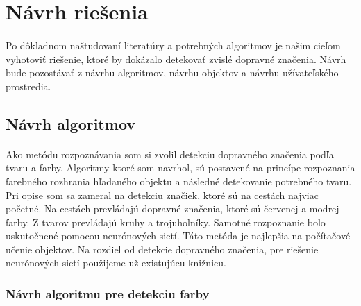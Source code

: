 \documentclass[12pt]{article}
\begin{document}
\section{Návrh riešenia}
\paragraph{}
Po dôkladnom naštudovaní literatúry a potrebných algoritmov je našim cieľom vyhotoviť riešenie, ktoré by dokázalo detekovať zvislé dopravné značenia.
Návrh bude pozostávať z návrhu algoritmov, návrhu objektov a návrhu užívateľského prostredia.
\subsection{Návrh algoritmov}
\paragraph{}
Ako metódu rozpoznávania som si zvolil detekciu dopravného značenia podľa tvaru a farby. 
Algoritmy ktoré som navrhol, sú postavené na princípe rozpoznania farebného rozhrania hľadaného objektu a následné detekovanie potrebného tvaru.
Pri opise som sa zameral na detekciu značiek, ktoré sú na cestách najviac početné.
Na cestách prevládajú dopravné značenia, ktoré sú červenej a modrej farby. Z tvarov prevládajú kruhy a trojuholníky.
Samotné rozpoznanie bolo uskutočnené pomocou neurónových sietí. Táto metóda je najlepšia na počítačové učenie objektov.
Na rozdiel od detekcie dopravného značenia, pre riešenie neurónových sietí použijeme už existujúcu knižnicu.
\subsubsection{Návrh algoritmu pre detekciu farby}
\end{document}
